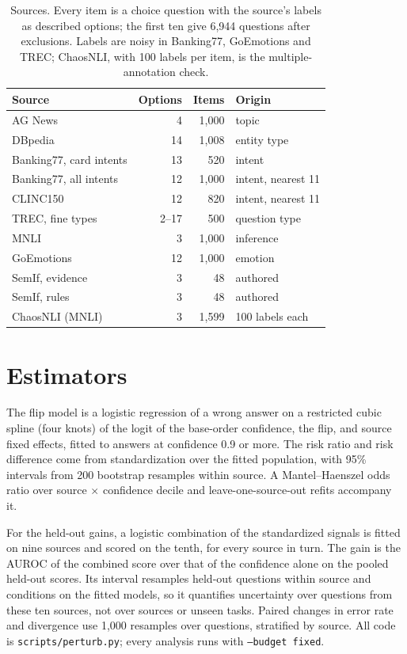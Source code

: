 \documentclass[10pt,twocolumn]{article}
\begin{document}
\begin{table}[t]
\centering\footnotesize
\begin{tabular}{@{}lrrl@{}}
\toprule
Source & Options & Items & Origin \\
\midrule
AG News & 4 & 1,000 & topic \\
DBpedia & 14 & 1,008 & entity type \\
Banking77, card intents & 13 & 520 & intent \\
Banking77, all intents & 12 & 1,000 & intent, nearest 11 \\
CLINC150 & 12 & 820 & intent, nearest 11 \\
TREC, fine types & 2--17 & 500 & question type \\
MNLI & 3 & 1,000 & inference \\
GoEmotions & 12 & 1,000 & emotion \\
SemIf, evidence & 3 & 48 & authored \\
SemIf, rules & 3 & 48 & authored \\
\midrule
ChaosNLI (MNLI) & 3 & 1,599 & 100 labels each \\
\bottomrule
\end{tabular}
\caption{Sources. Every item is a choice question with the source's labels as described options; the first ten give 6,944 questions after exclusions. Labels are noisy in Banking77, GoEmotions and TREC; ChaosNLI, with 100 labels per item, is the multiple-annotation check.}
\label{tab:data}
\end{table}

\section{Estimators}
\label{app:stats}
The flip model is a logistic regression of a wrong answer on a restricted cubic spline (four knots) of the logit of the base-order confidence, the flip, and source fixed effects, fitted to answers at confidence 0.9 or more. The risk ratio and risk difference come from standardization over the fitted population, with 95\% intervals from 200 bootstrap resamples within source. A Mantel--Haenszel odds ratio over source $\times$ confidence decile and leave-one-source-out refits accompany it.

For the held-out gains, a logistic combination of the standardized signals is fitted on nine sources and scored on the tenth, for every source in turn. The gain is the AUROC of the combined score over that of the confidence alone on the pooled held-out scores. Its interval resamples held-out questions within source and conditions on the fitted models, so it quantifies uncertainty over questions from these ten sources, not over sources or unseen tasks. Paired changes in error rate and divergence use 1,000 resamples over questions, stratified by source. All code is \texttt{scripts/perturb.py}; every analysis runs with \texttt{--budget fixed}.
\end{document}
